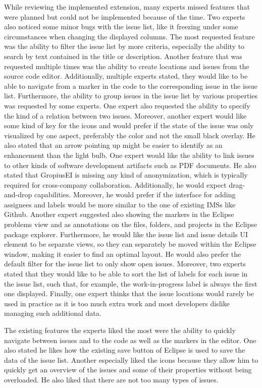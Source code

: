 While reviewing the implemented extension, many experts missed features that were planned but could not be implemented because of the time.
Two experts also noticed some minor bugs with the issue list, like it freezing under some circumstances when changing the displayed columns.
The most requested feature was the ability to filter the issue list by more criteria, especially the ability to search by text contained in the title or description.
Another feature that was requested multiple times was the ability to create locations and issues from the source code editor.
Additionally, multiple experts stated, they would like to be able to navigate from a marker in the code to the corresponding issue in the issue list.
Furthermore, the ability to group issues in the issue list by various properties was requested by some experts.
One expert also requested the ability to specify the kind of a relation between two issues.
Moreover, another expert would like some kind of key for the icons and would prefer if the state of the issue was only visualized by one aspect, preferably the color and not the small black overlay. He also stated that an arrow pointing up might be easier to identify as an enhancement than the light bulb.
One expert would like the ability to link issues to other kinds of software development artifacts such as \gls{PDF} documents.
He also stated that \gls{GropiusEI} is missing any kind of anonymization, which is typically required for cross-company collaboration.
Additionally, he would expect drag-and-drop capabilities.
Moreover, he would prefer if the interface for adding assignees and labels would be more similar to the one of existing \glspl{IMS} like Github.
Another expert suggested also showing the markers in the \gls{Eclipse} problems view and as annotations on the files, folders, and projects in the \gls{Eclipse} package explorer.
Furthermore, he would like the issue list and issue details \gls{UI} element to be separate views, so they can separately be moved within the \gls{Eclipse} window, making it easier to find an optimal layout.
He would also prefer the default filter for the issue list to only show open issues.
Moreover, two experts stated that they would like to be able to sort the list of labels for each issue in the issue list, such that, for example, the work-in-progress label is always the first one displayed.
Finally, one expert thinks that the issue locations would rarely be used in practice as it is too much extra work and most developers dislike managing such additional data.

The existing features the experts liked the most were the ability to quickly navigate between issues and to the code as well as the markers in the editor.
One also stated he likes how the existing save button of \gls{Eclipse} is used to save the data of the issue list.
Another especially liked the icons because they allow him to quickly get an overview of the issues and some of their properties without being overloaded.
He also liked that there are not too many types of issues.

